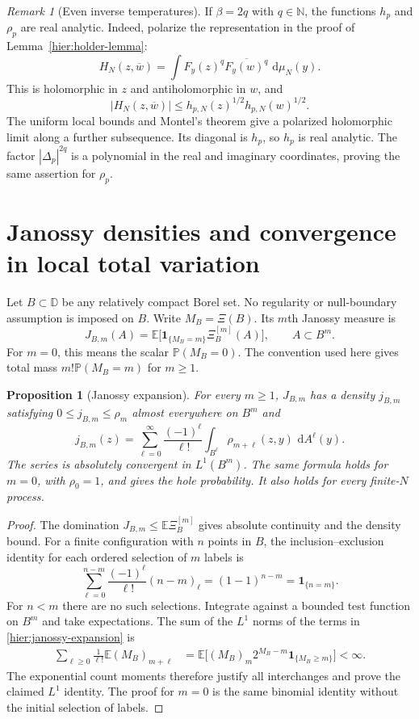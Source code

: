 \documentclass[11pt,a4paper]{article}
\numberwithin{equation}{section}
\newtheorem{proposition}[theorem]{Proposition}
\theoremstyle{definition}
\theoremstyle{remark}
\newtheorem{remark}[theorem]{Remark}
\newcommand{\D}{\mathbb D}
\newcommand{\E}{\mathbb E}
\newcommand{\Pbb}{\mathbb P}
\newcommand{\N}{\mathbb N}
\newcommand{\dd}{\,\mathrm d}
\newcommand{\ind}{\mathbf 1}
\begin{document}
\begin{remark}[Even inverse temperatures]
\label{hier:even-beta}
If $\beta=2q$ with $q\in\N$, the functions $h_p$ and $\rho_p$ are
real analytic.  Indeed, polarize the representation in the proof of
Lemma~\ref{hier:holder-lemma}:
\[
 H_N(z,\overline w)
 =\int F_y(z)^q\overline{F_y(w)^q}\,\dd\mu_N(y).
\]
This is holomorphic in $z$ and antiholomorphic in $w$, and
\[
 |H_N(z,\overline w)|
 \le h_{p,N}(z)^{1/2}h_{p,N}(w)^{1/2}.
\]
The uniform local bounds and Montel's theorem give a polarized
holomorphic limit along a further subsequence.  Its diagonal is $h_p$,
so $h_p$ is real analytic.  The factor $|\Delta_p|^{2q}$ is a
polynomial in the real and imaginary coordinates, proving the same
assertion for $\rho_p$.
\end{remark}

\section{Janossy densities and convergence in local total variation}
\label{hier:janossy-section}

Let $B\subset\D$ be any relatively compact Borel set.  No regularity
or null-boundary assumption is imposed on $B$.  Write $M_B=\Xi(B)$.
Its $m$th Janossy measure is
\[
 J_{B,m}(A)
 =\E\bigl[\ind_{\{M_B=m\}}\Xi_B^{[m]}(A)\bigr],
 \qquad A\subset B^m.
\]
For $m=0$, this means the scalar $\Pbb(M_B=0)$.  The convention used
here gives total mass $m!\Pbb(M_B=m)$ for $m\ge1$.

\begin{proposition}[Janossy expansion]
\label{hier:janossy-proposition}
For every $m\ge1$, $J_{B,m}$ has a density $j_{B,m}$ satisfying
$0\le j_{B,m}\le\rho_m$ almost everywhere on $B^m$ and
\begin{equation}
 j_{B,m}(z)
 =\sum_{\ell=0}^{\infty}\frac{(-1)^\ell}{\ell!}
       \int_{B^\ell}\rho_{m+\ell}(z,y)\,\dd A^\ell(y).
 \label{hier:janossy-expansion}
\end{equation}
The series is absolutely convergent in $L^1(B^m)$.  The same formula
holds for $m=0$, with $\rho_0=1$, and gives the hole probability.
It also holds for every finite-$N$ process.
\end{proposition}

\begin{proof}
The domination $J_{B,m}\le\E\Xi_B^{[m]}$ gives absolute continuity
and the density bound.  For a finite configuration with $n$ points
in $B$, the inclusion--exclusion identity for each ordered selection
of $m$ labels is
\[
 \sum_{\ell=0}^{n-m}\frac{(-1)^\ell}{\ell!}(n-m)_\ell
 =(1-1)^{n-m}=\ind_{\{n=m\}}.
\]
For $n<m$ there are no such selections.  Integrate against a bounded
test function on $B^m$ and take expectations.  The sum of the
$L^1$ norms of the terms in \eqref{hier:janossy-expansion} is
\begin{align*}
 \sum_{\ell\ge0}\frac1{\ell!}\E(M_B)_{m+\ell}
 &=\E\bigl[(M_B)_m2^{M_B-m}\ind_{\{M_B\ge m\}}\bigr]
 <\infty.
\end{align*}
The exponential count moments therefore justify all interchanges
and prove the claimed $L^1$ identity.  The proof for $m=0$ is the
same binomial identity without the initial selection of labels.
\end{proof}
\end{document}
